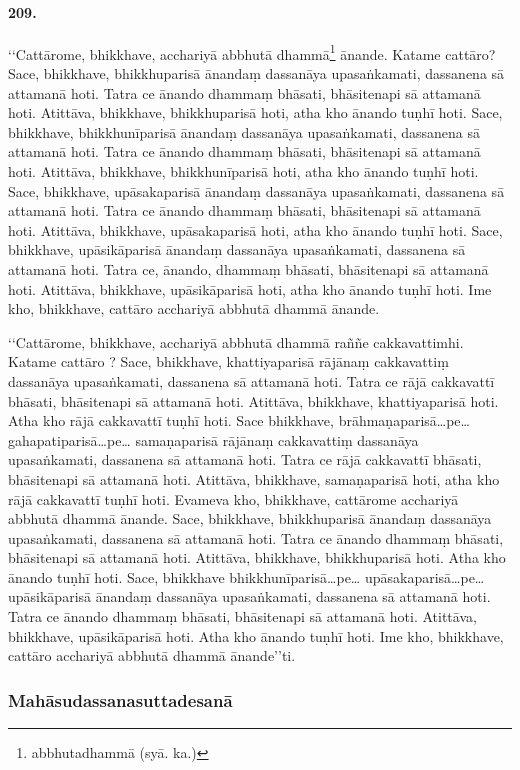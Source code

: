 \paragraph{209.} ‘‘Cattārome, bhikkhave, acchariyā abbhutā dhammā\footnote{abbhutadhammā (syā. ka.)} ānande. Katame cattāro? Sace, bhikkhave, bhikkhuparisā ānandaṃ dassanāya upasaṅkamati, dassanena sā attamanā hoti. Tatra ce ānando dhammaṃ bhāsati, bhāsitenapi sā attamanā hoti. Atittāva, bhikkhave, bhikkhuparisā hoti, atha kho ānando tuṇhī hoti. Sace, bhikkhave, bhikkhunīparisā ānandaṃ dassanāya upasaṅkamati, dassanena sā attamanā hoti. Tatra ce ānando dhammaṃ bhāsati, bhāsitenapi sā attamanā hoti. Atittāva, bhikkhave, bhikkhunīparisā hoti, atha kho ānando tuṇhī hoti. Sace, bhikkhave, upāsakaparisā ānandaṃ dassanāya upasaṅkamati, dassanena sā attamanā hoti. Tatra ce ānando dhammaṃ bhāsati, bhāsitenapi sā attamanā hoti. Atittāva, bhikkhave, upāsakaparisā hoti, atha kho ānando tuṇhī hoti. Sace, bhikkhave, upāsikāparisā ānandaṃ dassanāya upasaṅkamati, dassanena sā attamanā hoti. Tatra ce, ānando, dhammaṃ bhāsati, bhāsitenapi sā attamanā hoti. Atittāva, bhikkhave, upāsikāparisā hoti, atha kho ānando tuṇhī hoti. Ime kho, bhikkhave, cattāro acchariyā abbhutā dhammā ānande.

‘‘Cattārome, bhikkhave, acchariyā abbhutā dhammā raññe cakkavattimhi. Katame cattāro ? Sace, bhikkhave, khattiyaparisā rājānaṃ cakkavattiṃ dassanāya upasaṅkamati, dassanena sā attamanā hoti. Tatra ce rājā cakkavattī bhāsati, bhāsitenapi sā attamanā hoti. Atittāva, bhikkhave, khattiyaparisā hoti. Atha kho rājā cakkavattī tuṇhī hoti. Sace bhikkhave, brāhmaṇaparisā…pe… gahapatiparisā…pe… samaṇaparisā rājānaṃ cakkavattiṃ dassanāya upasaṅkamati, dassanena sā attamanā hoti. Tatra ce rājā cakkavattī bhāsati, bhāsitenapi sā attamanā hoti. Atittāva, bhikkhave, samaṇaparisā hoti, atha kho rājā cakkavattī tuṇhī hoti. Evameva kho, bhikkhave, cattārome acchariyā abbhutā dhammā ānande. Sace, bhikkhave, bhikkhuparisā ānandaṃ dassanāya upasaṅkamati, dassanena sā attamanā hoti. Tatra ce ānando dhammaṃ bhāsati, bhāsitenapi sā attamanā hoti. Atittāva, bhikkhave, bhikkhuparisā hoti. Atha kho ānando tuṇhī hoti. Sace, bhikkhave bhikkhunīparisā…pe… upāsakaparisā…pe… upāsikāparisā ānandaṃ dassanāya upasaṅkamati, dassanena sā attamanā hoti. Tatra ce ānando dhammaṃ bhāsati, bhāsitenapi sā attamanā hoti. Atittāva, bhikkhave, upāsikāparisā hoti. Atha kho ānando tuṇhī hoti. Ime kho, bhikkhave, cattāro acchariyā abbhutā dhammā ānande’’ti.

\subsubsection{Mahāsudassanasuttadesanā}

